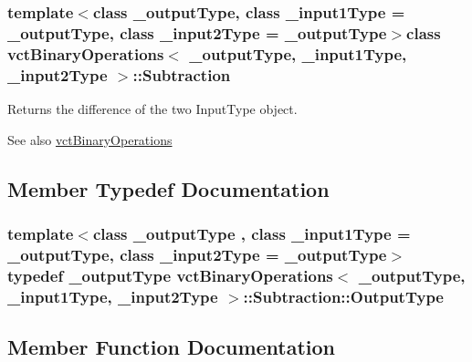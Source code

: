 \subsubsection*{template$<$class \+\_\+output\+Type, class \+\_\+input1\+Type = \+\_\+output\+Type, class \+\_\+input2\+Type = \+\_\+output\+Type$>$class vct\+Binary\+Operations$<$ \+\_\+output\+Type, \+\_\+input1\+Type, \+\_\+input2\+Type $>$\+::\+Subtraction}

Returns the difference of the two Input\+Type object. 

\begin{DoxySeeAlso}{See also}
\hyperlink{classvct_binary_operations}{vct\+Binary\+Operations} 
\end{DoxySeeAlso}


\subsection{Member Typedef Documentation}
\hypertarget{classvct_binary_operations_1_1_subtraction_acdf0aa04f6b08e9b6d199035f89071ff}{}
\subsubsection[{Output\+Type}]{\setlength{\rightskip}{0pt plus 5cm}template$<$class \+\_\+output\+Type , class \+\_\+input1\+Type  = \+\_\+output\+Type, class \+\_\+input2\+Type  = \+\_\+output\+Type$>$ typedef \+\_\+output\+Type {\bf vct\+Binary\+Operations}$<$ \+\_\+output\+Type, \+\_\+input1\+Type, \+\_\+input2\+Type $>$\+::{\bf Subtraction\+::\+Output\+Type}}\label{classvct_binary_operations_1_1_subtraction_acdf0aa04f6b08e9b6d199035f89071ff}


\subsection{Member Function Documentation}
\hypertarget{classvct_binary_operations_1_1_subtraction_a6fa58511ec33d3d452708dc8b90300a3}{}
